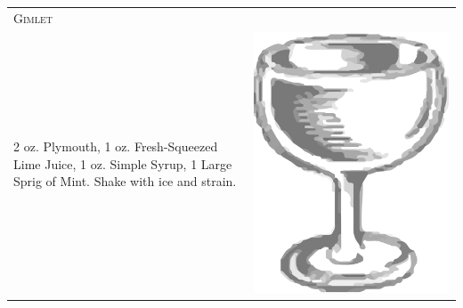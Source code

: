 \documentclass{article}
\begin{document}
\begin{multicols}{2}
\begin{tabular}{p{2in} p{0.5in}}
\multicolumn{2}{p{3in}}{\centering\Huge\textsc{Gimlet}} \\ 
   \vspace{-0.1in}2 oz. Plymouth, 1 oz. Fresh-Squeezed Lime Juice, 1 oz. Simple Syrup, 1 Large Sprig of Mint. Shake with ice and strain. &
   \vspace{-0.1in} \includegraphics{coupe.png}
\end{tabular}


\end{multicols}
\end{document}
